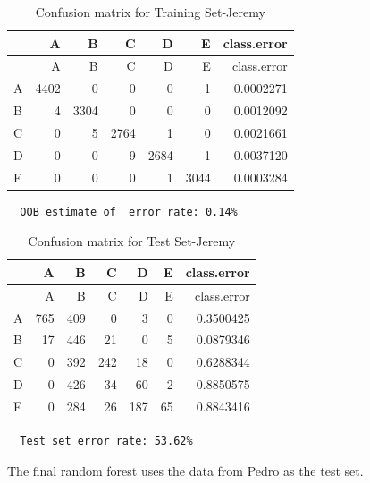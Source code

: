 \documentclass[12pt,twoside]{reedthesis}
\begin{document}
  \begin{longtable}[c]{@{}lrrrrrr@{}}
  \caption{Confusion matrix for Training Set-Jeremy}\tabularnewline
  \toprule
  & A & B & C & D & E & class.error\tabularnewline
  \midrule
  \endfirsthead
  \toprule
  & A & B & C & D & E & class.error\tabularnewline
  \midrule
  \endhead
  A & 4402 & 0 & 0 & 0 & 1 & 0.0002271\tabularnewline
  B & 4 & 3304 & 0 & 0 & 0 & 0.0012092\tabularnewline
  C & 0 & 5 & 2764 & 1 & 0 & 0.0021661\tabularnewline
  D & 0 & 0 & 9 & 2684 & 1 & 0.0037120\tabularnewline
  E & 0 & 0 & 0 & 1 & 3044 & 0.0003284\tabularnewline
  \bottomrule
  \end{longtable}
  
  \begin{verbatim}
  OOB estimate of  error rate: 0.14%
  \end{verbatim}
  
  \begin{longtable}[c]{@{}lrrrrrr@{}}
  \caption{Confusion matrix for Test Set-Jeremy}\tabularnewline
  \toprule
  & A & B & C & D & E & class.error\tabularnewline
  \midrule
  \endfirsthead
  \toprule
  & A & B & C & D & E & class.error\tabularnewline
  \midrule
  \endhead
  A & 765 & 409 & 0 & 3 & 0 & 0.3500425\tabularnewline
  B & 17 & 446 & 21 & 0 & 5 & 0.0879346\tabularnewline
  C & 0 & 392 & 242 & 18 & 0 & 0.6288344\tabularnewline
  D & 0 & 426 & 34 & 60 & 2 & 0.8850575\tabularnewline
  E & 0 & 284 & 26 & 187 & 65 & 0.8843416\tabularnewline
  \bottomrule
  \end{longtable}
  
  \begin{verbatim}
  Test set error rate: 53.62%
  \end{verbatim}
  
  The final random forest uses the data from Pedro as the test set.
  
  \begin{Shaded}
  \begin{Highlighting}[]
  \NormalTok{(}\NormalTok{)}
  
  \StringTok{ }\NormalTok{wl2[wl2$user_name ==}\StringTok{ }\NormalTok{subjects[}\NormalTok{], ]}
  \StringTok{ }\NormalTok{wl2[wl2$user_name !=}\StringTok{ }\NormalTok{subjects[}\NormalTok{], ]}
  \StringTok{ }\NormalTok{(} \NormalTok{OtherSubs6[, }\NormalTok{:}\NormalTok{], } 
                                  \NormalTok{Sub6[, }\NormalTok{:}\NormalTok{],}
                                  
                                  \NormalTok{)}
  \end{Highlighting}
  \end{Shaded}
  
\end{document}
